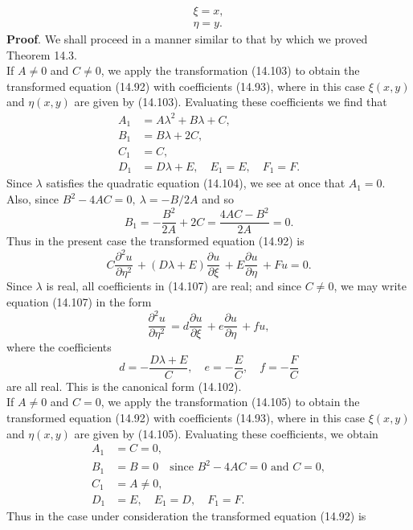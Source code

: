 \documentclass[11pt,a4paper, twoside]{report}
\newcommand{\pf}[2]{\dfrac{\partial #1}{\partial #2}\,}
\newcommand{\pfn}[3]{\dfrac{\partial^#3 #1}{\partial #2^#3}\,}
\begin{document}
	\begin{equation}\tag{14.106}
		\begin{aligned}
			\xi = x,\\
			\eta = y.
		\end{aligned}
	\end{equation}
	\textbf{Proof}. We shall proceed in a manner similar to that by which we proved Theorem 14.3.\\
	If $A \neq 0$ and $C \neq 0$, we apply the transformation (14.103) to obtain the transformed equation (14.92) with coefficients (14.93), where in this case $\xi(x, y)$ and $\eta(x, y)$ are given by (14.103). Evaluating these coefficients we find that
	\begin{align*}
		A_1 &= A\lambda^2 + B\lambda + C,\\
		B_1 &= B\lambda + 2C,\\
		C_1 &= C,\\
		D_1 &= D\lambda + E,\quad E_1 = E,\quad F_1 = F. 
	\end{align*}
	Since $\lambda$ satisfies the quadratic equation (14.104), we see at once that $A_1 = 0$. Also,  since $B^2 - 4AC = 0,\ \lambda = -B/2A$ and so
	$$
	B_1 = -\frac{B^2}{2A} + 2C = \frac{4AC - B^2}{2A} = 0.
	$$
	Thus in the present case the transformed equation (14.92) is
	\begin{equation}\tag{14.107}
		C\pfn{u}{\eta}{2} + (D\lambda + E)\pf{u}{\xi} + E\pf{u}{\eta} + Fu = 0.
	\end{equation}
	Since $\lambda$ is real, all coefficients in (14.107) are real; and since $C \neq 0$, we may write equation (14.107) in the form
	$$
	\pfn{u}{\eta}{2} = d\pf{u}{\xi} + e\pf{u}{\eta} + fu,
	$$
	where the coefficients
	$$
	d = -\frac{D\lambda + E}{C},\quad e = -\frac{E}{C},\quad f = -\frac{F}{C}
	$$
	are all real. This is the canonical form (14.102).\\
	If $A \neq 0$ and $C = 0$, we apply the transformation (14.105) to obtain the transformed
	equation (14.92) with coefficients (14.93), where in this case $\xi(x, y)$ and $\eta(x, y)$ are given by (14.105). Evaluating these coefficients, we obtain
	\begin{align*}
		A_1 &= C = 0,\\
		B_1 &= B = 0\quad \text{since $B^2 - 4AC = 0$ and $C = 0$},\\
		C_1 &= A \neq 0,\\
		D_1 &= E,\quad E_1 = D,\quad F_1 = F.
	\end{align*}
	Thus in the case under consideration the transformed equation (14.92) is
\end{document}
